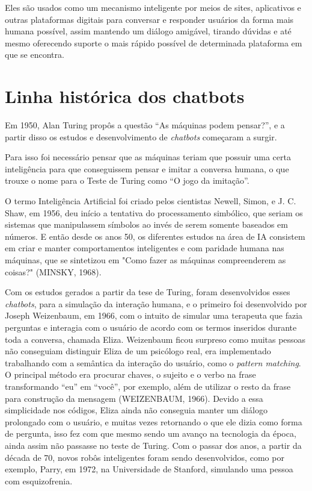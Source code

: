 \documentclass[
	12pt,				%
	oneside,
	a4paper,			%
	english,			%
	french,				%
	spanish,			%
	brazil				%
	]{abntex2}
\begin{document}
Eles são usados como um mecanismo inteligente por meios de sites, aplicativos e outras plataformas digitais para conversar e responder usuários da forma mais humana possível, assim mantendo um diálogo amigável, tirando dúvidas e até mesmo oferecendo suporte o mais rápido possível de determinada plataforma em que se encontra.

\section{Linha histórica dos chatbots}
Em 1950, Alan Turing propôs a questão “As máquinas podem pensar?”, e a partir disso os estudos e desenvolvimento de \emph{chatbots} começaram a surgir.

Para isso foi necessário pensar que as máquinas teriam que possuir uma certa inteligência para que conseguissem pensar e imitar a conversa humana, o que trouxe o nome para o Teste de Turing como “O jogo da imitação”.

O termo Inteligência Artificial foi criado pelos cientistas Newell, Simon, e J. C. Shaw, em 1956, deu início a tentativa do processamento simbólico, que seriam os sistemas que manipulassem símbolos ao invés de serem somente baseados em números.
E então desde os anos 50, os diferentes estudos na área de IA consistem em criar e manter comportamentos inteligentes e com paridade humana nas máquinas, que se sintetizou em "Como fazer as máquinas compreenderem as coisas?" (MINSKY, 1968).

Com os estudos gerados a partir da tese de Turing, foram desenvolvidos esses \emph{chatbots}, para a simulação da interação humana, e o primeiro foi desenvolvido por Joseph Weizenbaum, em 1966, com o intuito de simular uma terapeuta que fazia perguntas e interagia com o usuário de acordo com os termos inseridos durante toda a conversa, chamada Eliza.
Weizenbaum ficou surpreso como muitas pessoas não conseguiam distinguir Eliza de um psicólogo real, era implementado trabalhando com a semântica da interação do usuário, como o \emph{pattern matching}. O principal método era procurar chaves, o sujeito e o verbo na frase transformando “eu” em “você”, por exemplo, além de utilizar o resto da frase para construção da mensagem (WEIZENBAUM, 1966). Devido a essa simplicidade nos códigos, Eliza ainda não conseguia manter um diálogo prolongado com o usuário, e muitas vezes retornando o que ele dizia como forma de pergunta, isso fez com que mesmo sendo um avanço na tecnologia da época, ainda assim não passasse no teste de Turing.
Com o passar dos anos, a partir da década de 70, novos robôs inteligentes foram sendo desenvolvidos, como por exemplo, Parry, em 1972, na Universidade de Stanford, simulando uma pessoa com esquizofrenia. 
\end{document}
